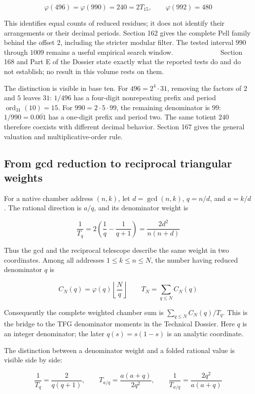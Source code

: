 \documentclass[
  11pt,
]{book}
\newcommand{\tnstatusbox}[2]{%
  {\setlength{\fboxsep}{2.1pt}%
   \colorbox{#1}{\textcolor{white}{\scriptsize\bfseries\hspace{0.5pt}#2\hspace{0.5pt}}}}}
\newcommand{\EVID}{\tnstatusbox{tnamber}{EVIDENCE}}
\begin{document}
\[
\boxed{\varphi(496)=\varphi(990)=240=2T_{15},\qquad
\varphi(992)=480}
\tag{NR.4}
\]

This identifies equal counts of reduced residues; it does not identify
their arrangements or their decimal periods. Section 162 gives the
complete Pell family behind the offset \(2\), including the stricter
modular filter. The tested interval \(990\) through \(1009\) remains a
useful empirical search window. \EVID{} Section 168 and Part E of the
Dossier state exactly what the reported tests do and do not establish;
no result in this volume rests on them.

The distinction is visible in base ten. For \(496=2^4\cdot31\), removing
the factors of \(2\) and \(5\) leaves \(31\): \(1/496\) has a four-digit
nonrepeating prefix and period \(\operatorname{ord}_{31}(10)=15\). For
\(990=2\cdot5\cdot99\), the remaining denominator is \(99\):
\(1/990=0.0\overline{01}\) has a one-digit prefix and period two. The
same totient \(240\) therefore coexists with different decimal behavior.
Section 167 gives the general valuation and multiplicative-order rule.

\subsection{From gcd reduction to reciprocal triangular
weights}\label{from-gcd-reduction-to-reciprocal-triangular-weights}

For a native chamber address \((n,k)\), let \(d=\gcd(n,k)\), \(q=n/d\),
and \(a=k/d\). The rational direction is \(a/q\), and its denominator
weight is

\[
\boxed{\frac1{T_q}
=2\left(\frac1q-\frac1{q+1}\right)
=\frac{2d^2}{n(n+d)}}
\tag{NR.5}
\]

Thus the gcd and the reciprocal telescope describe the same weight in
two coordinates. Among all addresses \(1\le k\le n\le N\), the number
having reduced denominator \(q\) is

\[
C_N(q)=\varphi(q)\left\lfloor\frac Nq\right\rfloor
\qquad T_N=\sum_{q\le N}C_N(q)
\tag{NR.6}
\]

Consequently the complete weighted chamber sum is
\(\sum_{q\le N}C_N(q)/T_q\). This is the bridge to the TFG denominator
moments in the Technical Dossier. Here \(q\) is an integer denominator;
the later \(q(s)=s(1-s)\) is an analytic coordinate.

The distinction between a denominator weight and a folded rational value
is visible side by side:

\[
\frac1{T_q}=\frac2{q(q+1)},\qquad
T_{a/q}=\frac{a(a+q)}{2q^2},\qquad
\frac1{T_{a/q}}=\frac{2q^2}{a(a+q)}
\tag{NR.7}
\]
\end{document}
